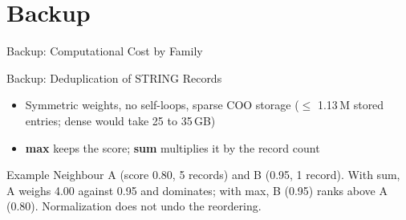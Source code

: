 \documentclass[aspectratio=169,11pt]{beamer}
\begin{document}
\begin{frame}
  \titlepage
\end{frame}

\appendix
\section*{Backup}

\begin{frame}{Backup: Computational Cost by Family}
  \begin{table}\scriptsize
    \caption{RTX A5500, 147 runs; lowest value in bold for s/epoch, h/run and VRAM.}
    \TabCost
  \end{table}
\end{frame}

\begin{frame}{Backup: Deduplication of STRING Records}
  \begin{itemize}\setlength{\itemsep}{0.45em}
    \item Symmetric weights, no self-loops, sparse COO storage ($\le$ 1.13\,M stored entries; dense would take
      25 to 35\,GB)
    \item \textbf{max} keeps the score; \textbf{sum} multiplies it by the record count
  \end{itemize}
  \begin{block}{Example}
    Neighbour A (score 0.80, 5 records) and B (0.95, 1 record). With sum, A weighs 4.00 against 0.95 and dominates;
    with max, B (0.95) ranks above A (0.80). Normalization does not undo the reordering.
  \end{block}
\end{frame}
\end{document}
